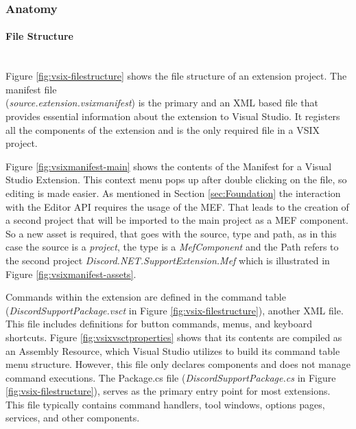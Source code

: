 \subsubsection{Anatomy}
\label{sssec:VSIXAnatomy}
\paragraph{File Structure}\mbox{}\\
\label{p:AnatomyFileStructure}
Figure \ref{fig:vsix-filestructure} shows the file structure of an extension project. The manifest file\\ (\textit{source.extension.vsixmanifest}) is the primary and an XML based file that provides essential information about the extension to Visual Studio. It registers all the components of the extension and is the only required file in a VSIX project.

Figure \ref{fig:vsixmanifest-main} shows the contents of the Manifest for a Visual Studio Extension. This context menu pops up after double clicking on the file, so editing is made easier. 
As mentioned in Section \ref{sec:Foundation} the interaction with the Editor API requires the usage of the MEF. That leads to the creation of a second project that will be imported to the main project as a MEF component. So a new asset is required, that goes with the source, type and path, as in this case the source is a \textit{project}, the type is a \textit{MefComponent} and the Path refers to the second project \textit{Discord.NET.SupportExtension.Mef} which is illustrated in Figure \ref{fig:vsixmanifest-assets}. \citep{vsixCookbook}


Commands within the extension are defined in the command table (\textit{DiscordSupportPackage.vsct} in Figure \ref{fig:vsix-filestructure}), another XML file. This file includes definitions for button commands, menus, and keyboard shortcuts. Figure \ref{fig:vsixvsctproperties} shows that its contents are compiled as an Assembly Resource, which Visual Studio utilizes to build its command table menu structure. However, this file only declares components and does not manage command executions. The Package.cs file (\textit{DiscordSupportPackage.cs} in Figure \ref{fig:vsix-filestructure}), serves as the primary entry point for most extensions. This file typically contains command handlers, tool windows, options pages, services, and other components. \citep{vsixCookbook}


